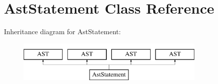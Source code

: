 \hypertarget{classAstStatement}{\section{Ast\-Statement Class Reference}
\label{classAstStatement}
}
Inheritance diagram for Ast\-Statement\-:\begin{figure}[H]
\begin{center}
\leavevmode
\includegraphics[height=2.000000cm]{classAstStatement}
\end{center}
\end{figure}
